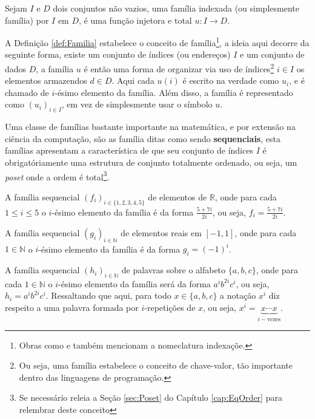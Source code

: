 \begin{definicao}\label{def:Familia}
	Sejam $I$ e $D$ dois conjuntos não vazios, uma família indexada (ou simplesmente família) por $I$ em $D$, é uma função injetora e total $u: I \rightarrow D$.
\end{definicao}

A Definição \ref{def:Familia} estabelece o conceito de família\footnote{Obras como \cite{halmos2001} e \cite{carmo2013} também mencionam a nomeclatura indexaçõe.}, a ideia aqui decorre da seguinte forma, existe um conjunto de índices (ou endereços) $I$ e um conjunto de dados $D$, a família $u$ é então uma forma de organizar via uso de índices\footnote{Ou seja, uma família estabelece o conceito de chave-valor, tão importante dentro das linguagens de programação.} $i \in I$ os elementos armazendos $d \in D$. Aqui cada $u(i)$ é escrito na verdade como $u_i$, e é chamado de $i$-ésimo elemento da família. Além disso, a família é representado como $(u_i)_{i \in I}$, em vez de simplesmente usar o símbolo $u$. 

Uma classe de famílias bastante importante na matemática, e por extensão na ciência da computação, são as família ditas como sendo \textbf{sequenciais}, esta famílias apresentam a característica de que seu conjunto de índices $I$ é obrigatóriamente uma estrutura de conjunto totalmente ordenado, ou seja, um \textit{poset} onde a ordem é total\footnote{Se necessário releia a Seção \ref{sec:Poset} do Capítulo \ref{cap:EqOrder} para relembrar deste conceito}.

\begin{exemplo}\label{exe:Familia1}
	A família sequencial $(f_i)_{i \in \{1, 2, 3, 4, 5\}}$ de elementos de $\mathbb{R}$, onde para cada $1 \leq i \leq 5$ o $i$-ésimo elemento da família é da forma $\frac{5 + 7i}{2i}$, ou seja, $f_i = \frac{5 + 7i}{2i}$.
\end{exemplo}

\begin{exemplo}\label{exe:Familia2}
	A família sequencial $(g_i)_{i \in \mathbb{N}}$ de elementos reais em $[-1, 1]$, onde para cada $1 \in \mathbb{N}$ o $i$-ésimo elemento da família é da forma $g_i = (-1)^i$.
\end{exemplo}

\begin{exemplo}\label{exe:Familia3}
	A família sequencial $(h_i)_{i \in \mathbb{N}}$ de palavras sobre o alfabeto $\{a, b, c\}$, onde para cada $1 \in \mathbb{N}$ o $i$-ésimo elemento da família será da forma $a^ib^{2i}c^i$, ou seja, $h_i = a^ib^{2i}c^i$. Ressaltando que aqui, para todo $x \in \{a, b, c\}$ a notação $x^i$ diz respeito a uma palavra formada por $i$-repetições de $x$, ou seja, $x^i = \underbrace{x \cdots x}_{i-\text{vezes}}$.
\end{exemplo}

